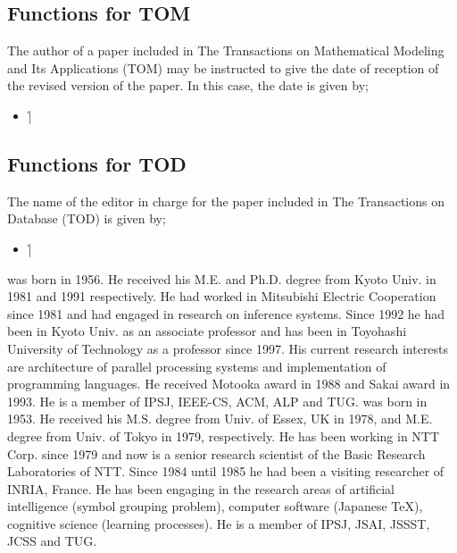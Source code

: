 
\subsection{Functions for TOM}

The author of a paper included in The Transactions on Mathematical Modeling
and Its Applications (TOM) may be instructed to give the date of reception
of the revised version of the paper.  In this case, the date is given by;
%
\begin{itemize}\item[]
\||
\end{itemize}


\subsection{Functions for TOD}

The name of the editor in charge for the paper included in The Transactions
on Database (TOD) is given by;
%
\begin{itemize}\item[]
\||
\end{itemize}


\begin{biography}
was born in 1956.  He received his M.E. and Ph.D. degree from Kyoto Univ. in
1981 and 1991 respectively.  He had worked in Mitsubishi Electric
Cooperation since 1981 and had engaged in research on inference systems.
Since 1992 he had been in Kyoto Univ. as an associate professor and has been
in Toyohashi University of Technology as a professor since 1997.  His
current research interests are architecture of parallel processing systems
and implementation of programming languages.  He received Motooka award in
1988 and Sakai award in 1993.  He is a member of IPSJ, IEEE-CS, ACM, ALP and 
TUG.
%
was born in 1953.  He received his M.S. degree from Univ. of Essex, UK in
1978, and M.E. degree from Univ. of Tokyo in 1979, respectively.  He has
been working in NTT Corp. since 1979 and now is a senior research scientist
of the Basic Research Laboratories of NTT.  Since 1984 until 1985 he had
been a visiting researcher of INRIA, France.  He has been engaging in the
research areas of artificial intelligence (symbol grouping problem),
computer software (Japanese \TeX), cognitive science (learning processes).
He is a member of IPSJ, JSAI, JSSST, JCSS and TUG.
\end{biography}


